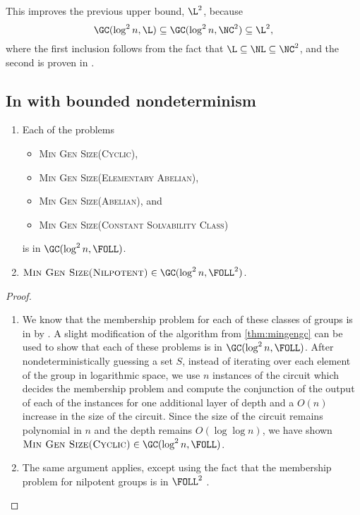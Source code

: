 \documentclass{article}
\begin{document}
This improves the previous upper bound, $\L^2$, because
\begin{equation*}
  \GC(\log^2 n, \L) \subseteq \GC(\log^2 n, \NC^2) \subseteq \L^2,
\end{equation*}
where the first inclusion follows from the fact that $\L \subseteq \NL \subseteq \NC^2$, and the second is proven in \cite[Lemma~3.2.8]{wolf90}.

\subsection{In \texorpdfstring{\FOLL}{FOLL} with bounded nondeterminism}

\begin{theorem}
  \mbox{}
  \begin{enumerate}
  \item Each of the problems
    \begin{itemize}
    \item \textsc{Min Gen Size(Cyclic)},
    \item \textsc{Min Gen Size(Elementary Abelian)},
    \item \textsc{Min Gen Size(Abelian)}, and
    \item \textsc{Min Gen Size(Constant Solvability Class)}
    \end{itemize}
    is in $\GC(\log^2 n, \FOLL)$.
  \item $\textsc{Min Gen Size(Nilpotent)} \in \GC(\log^2 n, \FOLL^2)$.
  \end{enumerate}
\end{theorem}
\begin{proof}
  \mbox{}
  \begin{enumerate}
  \item
    We know that the membership problem for each of these classes of groups is in \FOLL{} by \cite[Section~3]{bklm01}.
    A slight modification of the algorithm from \autoref{thm:mingengc} can be used to show that each of these problems is in $\GC(\log^2 n, \FOLL)$.
    After nondeterministically guessing a set $S$, instead of iterating over each element of the group in logarithmic space, we use $n$ instances of the \FOLL{} circuit which decides the membership problem and compute the conjunction of the output of each of the instances for one additional layer of depth and a $O(n)$ increase in the size of the circuit.
    Since the size of the circuit remains polynomial in $n$ and the depth remains $O(\log \log n)$, we have shown $\textsc{Min Gen Size(Cyclic)} \in \GC(\log^2 n, \FOLL)$.
  \item The same argument applies, except using the fact that the membership problem for nilpotent groups is in $\FOLL^2$ \cite[Corollary~3.12]{bklm01}. \qedhere
  \end{enumerate}
\end{proof}
\end{document}
